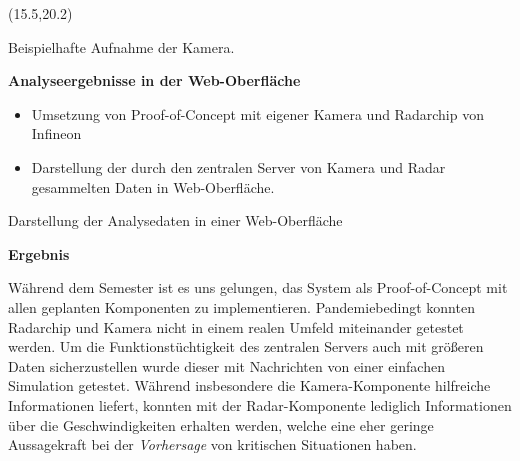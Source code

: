 \documentclass[%
textcolor=radacc_lightBlue,	%
pagecolor=radacc_darkblue,		%
]{../estposter}
\begin{document}

\begin{textblock}{12.5}(15.5,20.2)

\color{radacc_blue}
Beispielhafte Aufnahme der Kamera.
\par\smallskip

\color{radacc_blue}
\textbf{Analyseergebnisse in der Web-Oberfläche}
\par\smallskip

\color{radacc_lightBlue}

\begin{itemize}[leftmargin=10pt, rightmargin=10pt, topsep=3pt,itemsep=1pt,partopsep=1pt, parsep=1pt]
\item Umsetzung von Proof-of-Concept mit eigener Kamera und Radarchip von Infineon
		
\item Darstellung der durch den zentralen Server von Kamera und Radar gesammelten Daten in Web-Oberfläche.

\end{itemize}

\par\bigskip
\par\bigskip
\par\bigskip
\par\bigskip
\par\bigskip
\par\bigskip
\par\bigskip
\par\bigskip
\par\bigskip
\par\medskip

\color{radacc_blue}
Darstellung der Analysedaten in einer Web-Oberfläche
\par\smallskip

\color{radacc_blue}
\textbf{Ergebnis}
\par\smallskip

\color{radacc_lightBlue}
Während dem Semester ist es uns gelungen, das System als Proof-of-Concept mit allen geplanten Komponenten zu implementieren. Pandemiebedingt konnten Radarchip und Kamera nicht in einem realen Umfeld miteinander getestet werden. Um die Funktionstüchtigkeit des zentralen Servers auch mit größeren Daten sicherzustellen wurde dieser mit Nachrichten von einer einfachen Simulation getestet. Während insbesondere die Kamera-Komponente hilfreiche Informationen liefert, konnten mit der Radar-Komponente lediglich Informationen über die Geschwindigkeiten erhalten werden, welche eine eher geringe Aussagekraft bei der \emph{Vorhersage} von kritischen Situationen haben.


\end{textblock}
\end{document}
